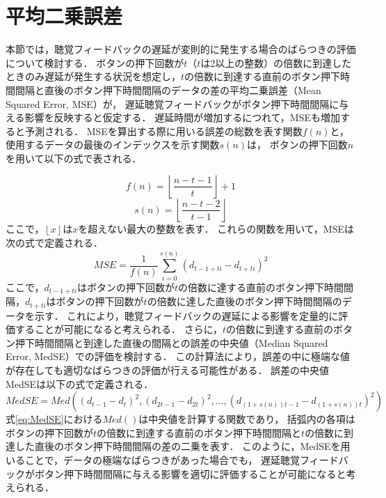 \section{平均二乗誤差}
本節では，聴覚フィードバックの遅延が変則的に発生する場合のばらつきの評価について検討する．
ボタンの押下回数が$t$（$t$は2以上の整数）の倍数に到達したときのみ遅延が発生する状況を想定し，$t$の倍数に到達する直前のボタン押下時間間隔と直後のボタン押下時間間隔のデータの差の平均二乗誤差（Mean Squared Error, MSE）が，
遅延聴覚フィードバックがボタン押下時間間隔に与える影響を反映すると仮定する．
遅延時間が増加するにつれて，MSEも増加すると予測される．
MSEを算出する際に用いる誤差の総数を表す関数$f(n)$と，使用するデータの最後のインデックスを示す関数$s(n)$は，
ボタンの押下回数$n$を用いて以下の式で表される．

\begin{equation}
f(n) = \left\lfloor \frac{n-t-1}{t} \right\rfloor + 1
\end{equation}
\begin{equation}
s(n) = \left\lfloor \frac{n-t-2}{t-1} \right\rfloor
\end{equation}
ここで，$\left\lfloor x \right\rfloor$は$x$を超えない最大の整数を表す．
これらの関数を用いて，MSEは次の式で定義される．
\begin{equation}
MSE = \frac{1}{f(n)} \sum_{i=0}^{s(n)} (d_{t-1+ti} - d_{t+ti})^2
\end{equation}
ここで，$d_{t-1+ti}$はボタンの押下回数が$t$の倍数に達する直前のボタン押下時間間隔，$d_{t+ti}$はボタンの押下回数が$t$の倍数に達した直後のボタン押下時間間隔のデータを示す．
これにより，聴覚フィードバックの遅延による影響を定量的に評価することが可能になると考えられる．
さらに，$t$の倍数に到達する直前のボタン押下時間間隔と到達した直後の間隔との誤差の中央値（Median Squared Error, MedSE）での評価を検討する．
この計算法により，誤差の中に極端な値が存在しても適切なばらつきの評価が行える可能性がある．
誤差の中央値MedSEは以下の式で定義される．
\begin{equation}
MedSE = Med\left((d_{t-1}-d_{t})^2, (d_{2t-1}-d_{2t})^2, \ldots, (d_{(1+s(n))t-1}-d_{(1+s(n))t})^2\right) \label{eq:MedSE}
\end{equation}
式\ref{eq:MedSE}における$Med()$は中央値を計算する関数であり，
括弧内の各項はボタンの押下回数が$t$の倍数に到達する直前のボタン押下時間間隔と$t$の倍数に到達した直後のボタン押下時間間隔の差の二乗を表す．
このように，MedSEを用いることで，データの極端なばらつきがあった場合でも，
遅延聴覚フィードバックがボタン押下時間間隔に与える影響を適切に評価することが可能になると考えられる．

